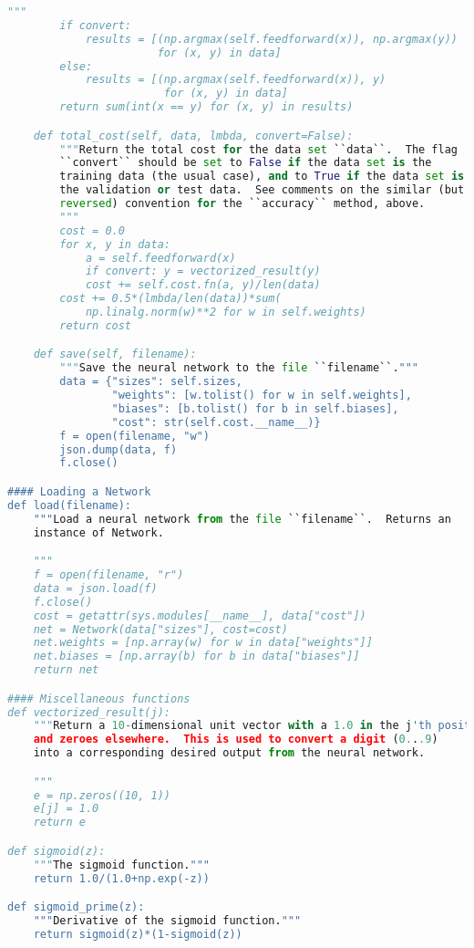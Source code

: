 \begin{lstlisting}[language=Python]
        """
        if convert:
            results = [(np.argmax(self.feedforward(x)), np.argmax(y))
                       for (x, y) in data]
        else:
            results = [(np.argmax(self.feedforward(x)), y)
                        for (x, y) in data]
        return sum(int(x == y) for (x, y) in results)

    def total_cost(self, data, lmbda, convert=False):
        """Return the total cost for the data set ``data``.  The flag
        ``convert`` should be set to False if the data set is the
        training data (the usual case), and to True if the data set is
        the validation or test data.  See comments on the similar (but
        reversed) convention for the ``accuracy`` method, above.
        """
        cost = 0.0
        for x, y in data:
            a = self.feedforward(x)
            if convert: y = vectorized_result(y)
            cost += self.cost.fn(a, y)/len(data)
        cost += 0.5*(lmbda/len(data))*sum(
            np.linalg.norm(w)**2 for w in self.weights)
        return cost

    def save(self, filename):
        """Save the neural network to the file ``filename``."""
        data = {"sizes": self.sizes,
                "weights": [w.tolist() for w in self.weights],
                "biases": [b.tolist() for b in self.biases],
                "cost": str(self.cost.__name__)}
        f = open(filename, "w")
        json.dump(data, f)
        f.close()

#### Loading a Network
def load(filename):
    """Load a neural network from the file ``filename``.  Returns an
    instance of Network.

    """
    f = open(filename, "r")
    data = json.load(f)
    f.close()
    cost = getattr(sys.modules[__name__], data["cost"])
    net = Network(data["sizes"], cost=cost)
    net.weights = [np.array(w) for w in data["weights"]]
    net.biases = [np.array(b) for b in data["biases"]]
    return net

#### Miscellaneous functions
def vectorized_result(j):
    """Return a 10-dimensional unit vector with a 1.0 in the j'th position
    and zeroes elsewhere.  This is used to convert a digit (0...9)
    into a corresponding desired output from the neural network.

    """
    e = np.zeros((10, 1))
    e[j] = 1.0
    return e

def sigmoid(z):
    """The sigmoid function."""
    return 1.0/(1.0+np.exp(-z))

def sigmoid_prime(z):
    """Derivative of the sigmoid function."""
    return sigmoid(z)*(1-sigmoid(z))
\end{lstlisting}

